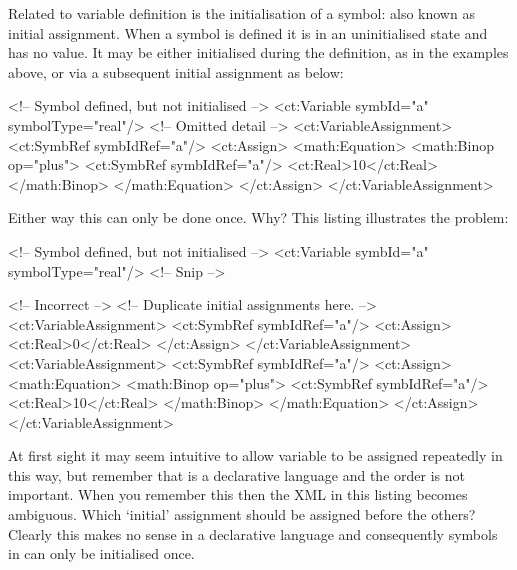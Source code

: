 %
Related to variable definition is the initialisation of a symbol: also
known as initial assignment. When a symbol is defined it is in an
uninitialised state and has no value. It may be either initialised
during the definition, as in the examples above, or via a subsequent
initial assignment as below:
%
\begin{xmlcode}
<!-- Symbol defined, but not initialised -->
<ct:Variable symbId="a" symbolType="real"/>
<!--  Omitted detail -->
<ct:VariableAssignment>
    <ct:SymbRef  symbIdRef="a"/>
    <ct:Assign>
        <math:Equation>
            <math:Binop op="plus">
                <ct:SymbRef symbIdRef="a"/>
                <ct:Real>10</ct:Real>
            </math:Binop>
        </math:Equation>
    </ct:Assign>
</ct:VariableAssignment>
\end{xmlcode}
%
Either way this can only be done once. Why? This listing illustrates
the problem:
\begin{xmlcode}
<!-- Symbol defined, but not initialised -->
<ct:Variable symbId="a" symbolType="real"/>
<!-- Snip -->

<!-- Incorrect -->
<!-- Duplicate initial assignments here. -->
<ct:VariableAssignment>
    <ct:SymbRef  symbIdRef="a"/>
    <ct:Assign>
        <ct:Real>0</ct:Real>
    </ct:Assign>
</ct:VariableAssignment>
<ct:VariableAssignment>
    <ct:SymbRef  symbIdRef="a"/>
    <ct:Assign>
        <math:Equation>
            <math:Binop op="plus">
                <ct:SymbRef symbIdRef="a"/>
                <ct:Real>10</ct:Real>
            </math:Binop>
        </math:Equation>
    </ct:Assign>
</ct:VariableAssignment>
\end{xmlcode}
At first sight it may seem intuitive to allow variable  to
be assigned repeatedly in this way, but remember that \pharmml is a
declarative language and the order is not important. When you remember
this then the XML in this listing
becomes ambiguous. Which `initial' assignment should be assigned
before the others? Clearly this makes no sense in a declarative
language and consequently symbols in \pharmml can only be initialised
once.


